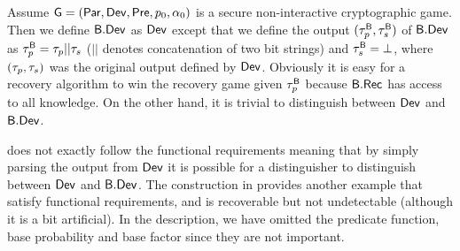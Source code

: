 \begin{ex}
Assume $\operatorname{\mathsf{G}}=\left(\operatorname{\mathsf{Par}},\operatorname{\mathsf{Dev}},\operatorname{\mathsf{Pre}},p_{0},\alpha_{0}\right)$ is a secure non-interactive cryptographic game. Then we define $\mathsf{B}.\mathsf{Dev}$ as $\operatorname{\mathsf{Dev}}$ except that we define the output $(\tau_p^{\mathsf{B}}, \tau_s^{\mathsf{B}})$ of $\mathsf{B}.\mathsf{Dev}$ as $\tau_p^{\mathsf{B}} = \tau_p \vert\vert \tau_s$ ($\vert\vert$ denotes concatenation of two bit strings) and $\tau_s^{\mathsf{B}} = \bot$, where $(\tau_p,\tau_s)$ was the original output defined by $\operatorname{\mathsf{Dev}}$. Obviously it is easy for a recovery algorithm to win the recovery game given $\tau_p^{\mathsf{B}}$ because $\mathsf{B}.\mathsf{Rec}$ has access to all knowledge. On the other hand, it is trivial to distinguish between $\operatorname{\mathsf{Dev}}$ and $\mathsf{B}.\mathsf{Dev}$. 
\end{ex}

 does not exactly follow the functional requirements meaning that by simply parsing the output from $\operatorname{\mathsf{Dev}}$ it is possible for a distinguisher to distinguish between $\operatorname{\mathsf{Dev}}$ and $\mathsf{B}.\mathsf{Dev}$. The construction in  provides another example that satisfy functional requirements, and is recoverable but not undetectable (although it is a bit artificial). In the description, we have omitted the predicate function, base probability and base factor since they are not important. 

